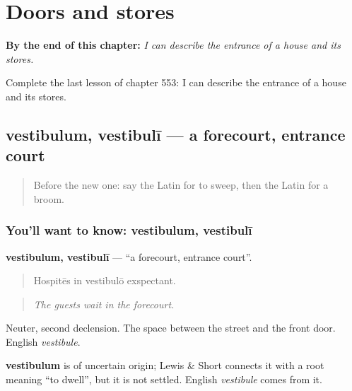 
\chapter{Doors and stores}
\label{ch:la-doors-and-stores}

\begin{chapteropening}
\textbf{By the end of this chapter:} \emph{I can describe the entrance of a house and its stores.}

Complete the last lesson of chapter 553: I can describe the entrance of a house and its stores.
\end{chapteropening}

\section[vestibulum, vestibulī]{vestibulum, vestibulī — a forecourt, entrance court}

\label{lesson:LA-C553-vestibulum}



\begin{quote}
Before the new one: say the Latin for to sweep, then the Latin for a broom.
\end{quote}

\subsection*{You'll want to know: vestibulum, vestibulī}
\textbf{vestibulum, vestibulī} — \textquotedblleft{}a forecourt, entrance court\textquotedblright{}.

\begin{quote}
Hospitēs in vestibulō exspectant.
\end{quote}

\begin{quote}
\emph{The guests wait in the forecourt.}
\end{quote}

Neuter, second declension. The space between the street and the front door. English \emph{vestibule}.

\begin{cousinweb}
\textbf{vestibulum} is of uncertain origin; Lewis \& Short connects it with a root meaning \textquotedblleft{}to dwell\textquotedblright{}, but it is not settled. English \emph{vestibule} comes from it.
\end{cousinweb}

